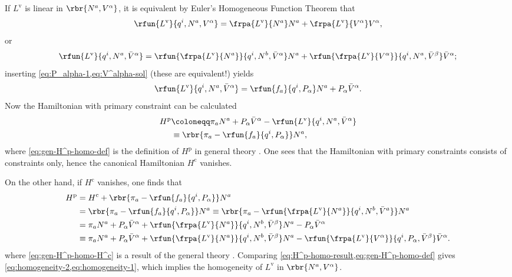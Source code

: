 If $L^\text{v}$ is linear in $\rbr{N^a, V^\alpha}$, it is equivalent by Euler's 
Homogeneous Function Theorem \cite{Border_2000} that
\begin{equation}
\rfun{L^\text{v}}{q^i, N^a, V^\alpha} = \frpa{L^\text{v}}{N^a}N^a + 
\frpa{L^\text{v}}{V^\alpha}V^\alpha,
\label{eq:homogeneity-1}
\end{equation}
or
\begin{equation}
\rfun{L^\text{v}}{q^i, N^a, \bar V^\alpha} =
\rfun{\frpa{L^\text{v}}{N^a}}{q^i, N^b, \bar V^\alpha} N^a + 
\rfun{\frpa{L^\text{v}}{V^\alpha}}{q^i, N^a, \bar V^\beta} \bar V^\alpha;
\label{eq:homogeneity-2}
\end{equation}
inserting \cref{eq:P_alpha-1,eq:V^alpha-sol} (these are equivalent!) yields
\begin{equation}
\rfun{L^\text{v}}{q^i, N^a, \bar V^\alpha} = \rfun{f_a}{q^i, P_\alpha} N^a + 
P_\alpha \bar V^\alpha.
\label{eq:L^v-bar-V}
\end{equation}
Now the Hamiltonian with primary constraint can be calculated
\begin{align}
H^\text{p} &\coloneqq \pi_a N^a + P_\alpha \bar V^\alpha - 
\rfun{L^\text{v}}{q^i, N^a, \bar V^\alpha} \label{eq:gen-H^p-homo-def} \\
&\equiv \rbr{\pi_a - \rfun{f_a}{q^i, P_\alpha}}N^a,
\end{align}
where \cref{eq:gen-H^p-homo-def} is the definition of $H^\text{p}$ in general
theory \cite[ch.~2]{Gitman_1990}. One sees that the Hamiltonian with primary 
constraints consists of constraints only, hence the canonical Hamiltonian 
$H^\text{c}$ vanishes.

On the other hand, if $H^\text{c}$ vanishes, one finds that
\begin{align}
H^\text{p} &= H^\text{c} + \rbr{\pi_a - \rfun{f_a}{q^i, P_\alpha}}N^a 
\label{eq:gen-H^p-homo-H^c} \\
&= \rbr{\pi_a - \rfun{f_a}{q^i, P_\alpha}}N^a 
\equiv \rbr{\pi_a - \rfun{\frpa{L^\text{v}}{N^a}}{q^i, N^b, \bar V^a}} N^a
\nonumber \\
&= \pi_a N^a + P_\alpha \bar V^\alpha
+ \rfun{\frpa{L^\text{v}}{N^a}}{q^i, N^b, \bar V^\beta} N^a
- P_\alpha \bar V^\alpha \nonumber \\
&\equiv \pi_a N^a + P_\alpha \bar V^\alpha
+ \rfun{\frpa{L^\text{v}}{N^a}}{q^i, N^b, \bar V^\beta} N^a
- \rfun{\frpa{L^\text{v}}{V^\alpha}}{q^i, P_\alpha, \bar V^\beta}
\bar V^\alpha. \label{eq:H^p-homo-result}
\end{align}
where \cref{eq:gen-H^p-homo-H^c} is a result of the general theory 
\cite[ch.~2]{Gitman_1990}. Comparing 
\cref{eq:H^p-homo-result,eq:gen-H^p-homo-def} gives 
\cref{eq:homogeneity-2,eq:homogeneity-1}, which implies the homogeneity of 
$L^\text{v}$ in $\rbr{N^a, V^\alpha}$.

